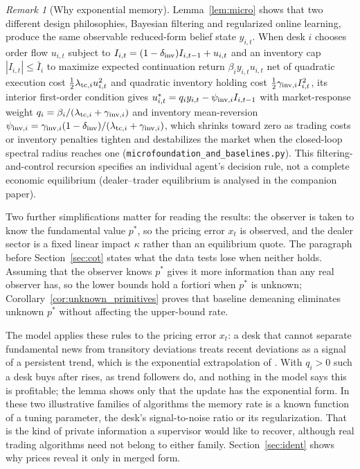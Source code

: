 \documentclass[12pt]{article}
\theoremstyle{definition}
\theoremstyle{remark}
\newtheorem{remark}[theorem]{Remark}
\begin{document}
\begin{remark}[Why exponential memory]
Lemma~\ref{lem:micro} shows that two different design philosophies, Bayesian filtering and regularized online learning, produce the same observable reduced-form belief state $y_{i,t}$. When desk $i$ chooses order flow $u_{i,t}$ subject to $I_{i,t}=(1-\delta_{\rm inv})I_{i,t-1}+u_{i,t}$ and an inventory cap $|I_{i,t}|\le\bar I_i$ to maximize expected continuation return $\beta_i y_{i,t}u_{i,t}$ net of quadratic execution cost $\tfrac12\lambda_{{\rm tc},i}u_{i,t}^2$ and quadratic inventory holding cost $\tfrac12\gamma_{{\rm inv},i}I_{i,t}^2$, its interior first-order condition gives $u_{i,t}^*=q_iy_{i,t}-\psi_{{\rm inv},i}I_{i,t-1}$ with market-response weight $q_i=\beta_i/(\lambda_{{\rm tc},i}+\gamma_{{\rm inv},i})$ and inventory mean-reversion $\psi_{{\rm inv},i}=\gamma_{{\rm inv},i}(1-\delta_{\rm inv})/(\lambda_{{\rm tc},i}+\gamma_{{\rm inv},i})$, which shrinks toward zero as trading costs or inventory penalties tighten and destabilizes the market when the closed-loop spectral radius reaches one (\texttt{microfoundation\_and\_baselines.py}). This filtering-and-control recursion specifies an individual agent's decision rule, not a complete economic equilibrium (dealer--trader equilibrium is analysed in the companion paper).

Two further simplifications matter for reading the results: the observer is taken to know the fundamental value $p^*$, so the pricing error $x_t$ is observed, and the dealer sector is a fixed linear impact $\kappa$ rather than an equilibrium quote. The paragraph before Section~\ref{sec:cot} states what the data tests lose when neither holds. Assuming that the observer knows $p^*$ gives it more information than any real observer has, so the lower bounds hold a fortiori when $p^*$ is unknown; Corollary~\ref{cor:unknown_primitives} proves that baseline demeaning eliminates unknown $p^*$ without affecting the upper-bound rate.

The model applies these rules to the pricing error $x_t$: a desk that cannot separate fundamental news from transitory deviations treats recent deviations as a signal of a persistent trend, which is the exponential extrapolation of \citet{barberis2015,barberis2018}. With $q_i>0$ such a desk buys after rises, as trend followers do, and nothing in the model says this is profitable; the lemma shows only that the update has the exponential form. In these two illustrative families of algorithms the memory rate is a known function of a tuning parameter, the desk's signal-to-noise ratio or its regularization. That is the kind of private information a supervisor would like to recover, although real trading algorithms need not belong to either family. Section~\ref{sec:ident} shows why prices reveal it only in merged form.
\end{remark}
\end{document}
